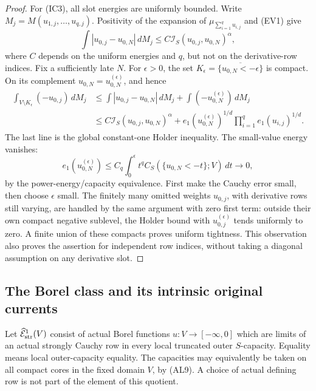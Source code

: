 \begin{proof}
For (IC3), all slot energies are uniformly bounded. Write
$M_j=M(u_{1,j},\ldots,u_{q,j})$. Positivity of the expansion
of $\mu_{\sum_{i=1}^q u_{i,j}}$ and (EV1) give
\[
             \int|u_{0,j}-u_{0,N}|\,dM_j
                  \leq C\mathscr I_S(u_{0,j},u_{0,N})^\alpha,
 \tag{IC6}
\]
where $C$ depends on the uniform energies and $q$, but not on
the derivative-row indices. Fix a sufficiently late $N$.
For $\epsilon>0$, the set
$K_\epsilon=\overline{\{u_{0,N}<-\epsilon\}}$ is compact.
On its complement $u_{0,N}=u_{0,N}^{(\epsilon)}$, and hence
\[
 \begin{split}
 \int_{V\setminus K_\epsilon}(-u_{0,j})\,dM_j
 &\leq \int|u_{0,j}-u_{0,N}|\,dM_j
          +\int(-u_{0,N}^{(\epsilon)})\,dM_j\\
 &\leq C\mathscr I_S(u_{0,j},u_{0,N})^\alpha
       +e_1(u_{0,N}^{(\epsilon)})^{1/d}
                          \prod_{i=1}^q e_1(u_{i,j})^{1/d}.
 \end{split}
 \tag{IC7}
\]
The last line is the global constant-one Holder inequality.
The small-value energy vanishes:
\[
 e_1(u_{0,N}^{(\epsilon)})
   \leq C_q\int_0^\epsilon t^q
                    C_S(\{u_{0,N}<-t\};V)\,dt\longrightarrow0,
 \tag{IC8}
\]
by the power-energy/capacity equivalence. First make the
Cauchy error small, then choose $\epsilon$ small. The
finitely many omitted weights $u_{0,j}$, with derivative
rows still varying, are handled by the same argument with
zero first term: outside their own compact negative sublevel,
the Holder bound with $u_{0,j}^{(\epsilon)}$ tends uniformly
to zero. A finite union of these compacts proves uniform
tightness. This observation also proves the assertion for
independent row indices, without taking a diagonal assumption
on any derivative slot.
\end{proof}

\subsection{The Borel class and its intrinsic original currents}

\begin{definition}
\label{def:r11-strong-first-energy-completion}
Let $\widehat{\mathcal E}^1_{\rm str}(V)$ consist of actual
Borel functions $u:V\to[-\infty,0]$ which are limits of an
actual strongly Cauchy row in every local truncated outer
$S$-capacity. Equality means local outer-capacity equality.
The capacities may equivalently be taken on all compact
cores in the fixed domain $V$, by (AL9). A choice of actual
defining row is not part of the element of this quotient.
\end{definition}

